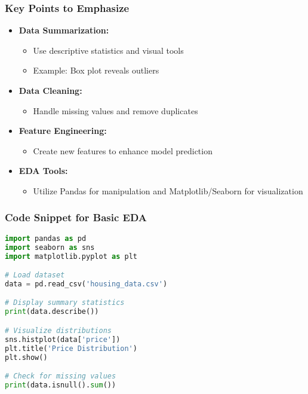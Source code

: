 \documentclass[aspectratio=169]{beamer}
\begin{document}
\begin{frame}[fragile]
    \frametitle{Key Points to Emphasize}
    \begin{itemize}
        \item \textbf{Data Summarization:}
        \begin{itemize}
            \item Use descriptive statistics and visual tools
            \item Example: Box plot reveals outliers
        \end{itemize}

        \item \textbf{Data Cleaning:}
        \begin{itemize}
            \item Handle missing values and remove duplicates
        \end{itemize}

        \item \textbf{Feature Engineering:}
        \begin{itemize}
            \item Create new features to enhance model prediction
        \end{itemize}

        \item \textbf{EDA Tools:}
        \begin{itemize}
            \item Utilize Pandas for manipulation and Matplotlib/Seaborn for visualization
        \end{itemize}
    \end{itemize}
\end{frame}

\begin{frame}[fragile]
    \frametitle{Code Snippet for Basic EDA}
    \begin{lstlisting}[language=Python]
import pandas as pd
import seaborn as sns
import matplotlib.pyplot as plt

# Load dataset
data = pd.read_csv('housing_data.csv')

# Display summary statistics
print(data.describe())

# Visualize distributions
sns.histplot(data['price'])
plt.title('Price Distribution')
plt.show()

# Check for missing values
print(data.isnull().sum())
    \end{lstlisting}
\end{frame}
\end{document}
